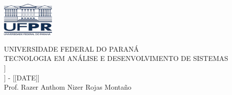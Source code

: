 \begin{minipage}[t]{.15\linewidth} 
\strut\vspace*{-\baselineskip}\newline\includegraphics[height=1.7cm]{logo}
\end{minipage}
\hspace{0.02\linewidth}
\begin{minipage}[t]{.7\linewidth}
\small
UNIVERSIDADE FEDERAL DO PARANÁ\\
TECNOLOGIA EM ANÁLISE E DESENVOLVIMENTO DE SISTEMAS\\
[[CLASS]]\\
[[EXAM]] - [[DATE]]\\
Prof. Razer Anthom Nizer Rojas Montaño\\
\end{minipage}


{\small
{}
}




